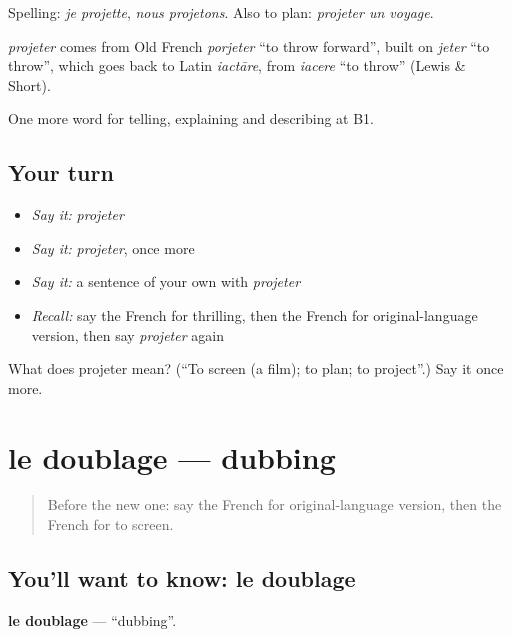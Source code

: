 Spelling: \emph{je projette}, \emph{nous projetons}. Also to plan: \emph{projeter un voyage}.

\begin{cousinweb}
\emph{projeter} comes from Old French \emph{porjeter} \textquotedblleft{}to throw forward\textquotedblright{}, built on \emph{jeter} \textquotedblleft{}to throw\textquotedblright{}, which goes back to Latin \emph{iactāre}, from \emph{iacere} \textquotedblleft{}to throw\textquotedblright{} (Lewis \& Short).
\end{cousinweb}

\begin{grammarlens}[title={What you've built}]
One more word for telling, explaining and describing at B1.
\end{grammarlens}

\subsection*{Your turn}
\begin{itemize}
\raggedright
  \item \emph{Say it:} \emph{projeter}
  \item \emph{Say it:} \emph{projeter}, once more
  \item \emph{Say it:} a sentence of your own with \emph{projeter}
  \item \emph{Recall:} say the French for thrilling, then the French for original-language version, then say \emph{projeter} again
\end{itemize}

\begin{tcolorbox}[breakable,colback=teal!4,colframe=teal!35!black,title={Before you move on}]
What does projeter mean? (\textquotedblleft{}To screen (a film); to plan; to project\textquotedblright{}.) Say it once more.
\end{tcolorbox}
\section[le doublage]{le doublage — dubbing}

\label{lesson:FR-C524-doublage}



\begin{quote}
Before the new one: say the French for original-language version, then the French for to screen.
\end{quote}

\subsection*{You'll want to know: le doublage}
\textbf{le doublage} — \textquotedblleft{}dubbing\textquotedblright{}.

